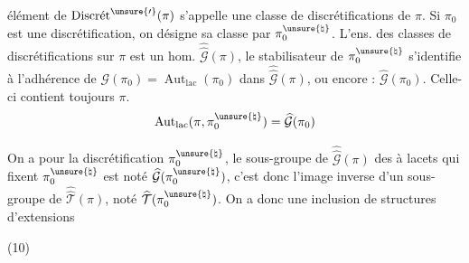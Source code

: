 
 élément de $\operatorname{Discr\acute{e}t}^{\unsure{\prime}}(\pi)$ s'appelle une
classe de discrétifications de $\pi$.
Si $\pi_0$ est une discrétification, on désigne sa classe par
$\pi_0^{\unsure{\natural}}$. L'ens. des classes de discrétifications sur $\pi$
est un  hom. $\widehat{\widehat{\mathcal{G}}}(\pi)$, le stabilisateur
de $\pi_0^{\unsure{\natural}}$ s'identifie à l'adhérence de
$\mathcal{G}(\pi_0)=\operatorname{Aut}_{\mathrm{lac}}(\pi_0)$ dans
$\widehat{\widehat{\mathcal{G}}}(\pi)$, ou encore :
$\widehat{\mathcal{G}}(\pi_0)$.
Celle-ci contient toujours $\pi$.
\[
\operatorname{Aut}_{\mathrm{lac}}(\pi,\pi_0^{\unsure{\natural}})
=\widehat{\mathcal{G}}(\pi_0)
\]

On a pour la discrétification $\pi_0^{\unsure{\natural}}$, le sous-groupe de
$\widehat{\widehat{\mathcal{G}}}(\pi)$ des  à lacets qui fixent
$\pi_0^{\unsure{\natural}}$ est noté $\widehat{\mathcal{G}}(\pi_0^{\unsure{\natural}})$,
c'est donc l'image inverse d'un sous-groupe de
$\widehat{\widehat{\mathcal{T}}}(\pi)$, noté
$\widehat{\mathcal{T}}(\pi_0^{\unsure{\natural}})$. On a donc une inclusion de
structures d'extensions

(10)


